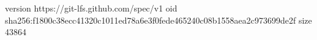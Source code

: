 version https://git-lfs.github.com/spec/v1
oid sha256:f1800c38ecc41320c1011ed78a6e3f0fede465240c08b1558aea2c973699de2f
size 43864
